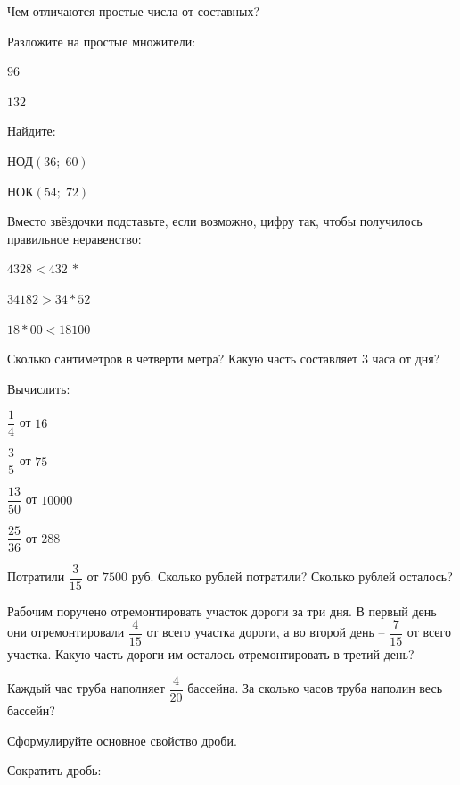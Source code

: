 \begin{listofex}
	\item Чем отличаются простые числа от составных?
	\item Разложите на простые множители:
	\begin{enumcols}[itemcolumns=2]
		\item \( 96 \)
		\item \( 132 \)
	\end{enumcols}
	\item Найдите:
	\begin{enumcols}[itemcolumns=2]
		\item НОД\( (36;\;60) \)
		\item НОК\( (54;\;72) \)
	\end{enumcols}
	\item Вместо звёздочки подставьте, если возможно, цифру так, чтобы получилось правильное
	неравенство:
	\begin{enumcols}[itemcolumns=3]
		\item \( 4328 < 432\:* \)
		\item \( 34182 > 34*52 \)
		\item \( 18*00 < 18100 \)
	\end{enumcols}
	\item Сколько сантиметров в четверти метра? Какую часть составляет 3 часа от дня?
	\item Вычислить:
	\begin{enumcols}[itemcolumns=4]
		\item \( \dfrac{1}{4} \) от \( 16 \)
		\item \( \dfrac{3}{5} \) от \( 75 \)
		\item \( \dfrac{13}{50} \) от \( 10000 \)
		\item \( \dfrac{25}{36} \) от \( 288 \)
	\end{enumcols}
	\item Потратили \( \dfrac{3}{15} \) от \( 7500 \) руб. Сколько рублей потратили? Сколько рублей осталось?
	\item Рабочим поручено отремонтировать участок дороги за три дня. В первый день они отремонтировали \( \dfrac{4}{15} \) от всего участка дороги, а во второй день -- \( \dfrac{7}{15} \) от всего участка. Какую часть дороги им осталось отремонтировать в третий день?
	\item Каждый час труба наполняет \( \dfrac{4}{20} \) бассейна. За сколько часов труба наполин весь бассейн?
	\item Сформулируйте основное свойство дроби.
	\item Сократить дробь:

\end{listofex}
